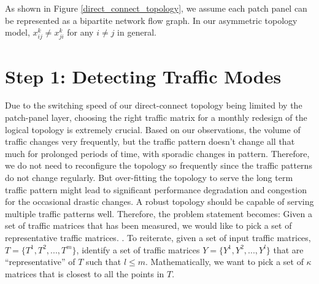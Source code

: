 \documentclass[sigconf]{acmart}
\theoremstyle{definition}
\begin{document}
As shown in Figure \ref{direct_connect_topology}, we assume each patch panel can be represented as a bipartite network flow graph. In our asymmetric topology model, $x_{ij}^k \neq x_{ji}^k$ for any $i \neq j$ in general. 


%

\section{Step 1: Detecting Traffic Modes} \label{section_detecting_traffic_modes}
Due to the switching speed of our direct-connect topology being limited by the patch-panel layer, choosing the right traffic matrix for a monthly redesign of the logical topology is extremely crucial. Based on our observations, the volume of traffic changes very frequently, but the traffic pattern doesn't change all that much for prolonged periods of time, with sporadic changes in pattern. Therefore, we do not need to reconfigure the topology so frequently since the traffic patterns do not change regularly. But over-fitting the topology to serve the long term traffic pattern might lead to significant performance degradation and congestion for the occasional drastic changes. A robust topology should be capable of serving multiple traffic patterns well. Therefore, the problem statement becomes: Given a set of traffic matrices that has been measured, we would like to pick a set of representative traffic matrices.  \cite{zhang2005finding}. To reiterate, given a set of input traffic matrices, $T = \{T^1, T^2, ..., T^m\}$, identify a set of traffic matrices $Y = \{Y^1, Y^2, ..., Y^l\}$ that are ``representative'' of $T$ such that $l \leq m$. Mathematically, we want to pick a set of $\kappa$ matrices that is closest to all the points in $T$. 
\end{document}
